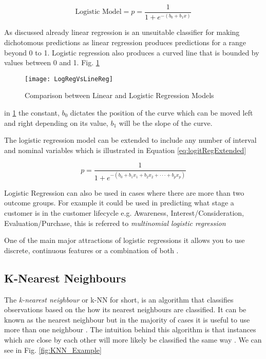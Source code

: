 \begin{equation} \label{eq:logitReg}
	\text{Logistic Model}  =  p  =  \frac{1}{1 + e^{-(b_0 + b_1x)}}
\end{equation}

As discussed already linear regression is an unsuitable classifier for making dichotomous predictions as linear regression produces predictions for a range beyond 0 to 1. Logistic regression also produces a curved line that is bounded by values between 0 and 1. Fig. \ref{fig:LogRegVsLineReg}

\begin{figure}[H]
	\texttt{[image: LogRegVsLineReg]}
	\caption{Comparison between Linear and Logistic Regression Models}
	\label{fig:LogRegVsLineReg}
\end{figure}

in \ref{fig:LogRegVsLineReg} the constant, $b_0$ dictates the position of the curve which can be moved left and right depending on its value, $b_1$ will be the slope of the curve. 

The logistic regression model can be extended to include any number of interval and nominal variables which is illustrated in Equation \ref{eq:logitRegExtended}

\begin{equation} \label{eq:logitRegExtended}
	p  =  \frac{1}{1 + e^{-(b_0 + b_1x_1 + b_2x_2 +\cdot\cdot\cdot+ b_px_p )}}
\end{equation}

Logistic Regression can also be used in cases where there are more than two outcome groups. For example it could be used in predicting what stage a customer is in the customer lifecycle e.g. Awareness, Interest/Consideration, Evaluation/Purchase, this is referred to \textit{multinomial logistic regression}


One of the main major attractions of logistic regressions it allows you to use discrete, continuous features or a combination of both \citep{lee_application_2005}.

\subsection{K-Nearest Neighbours} \label{kNN}
The \textit{k-nearest neighbour} or {k-NN} for short, is an algorithm that classifies observations based on the how its nearest neighbours are classified. It can be known as the nearest neighbour but in the majority of cases it is useful to use more than one neighbour \citep{henley_k-nearest-neighbour_1996}. The intuition behind this algorithm is that instances which are close by each other will more likely be classified the same way \citep{cover_nearest_1967}. We can see in Fig. \ref{fig:KNN_Example}\\ %


